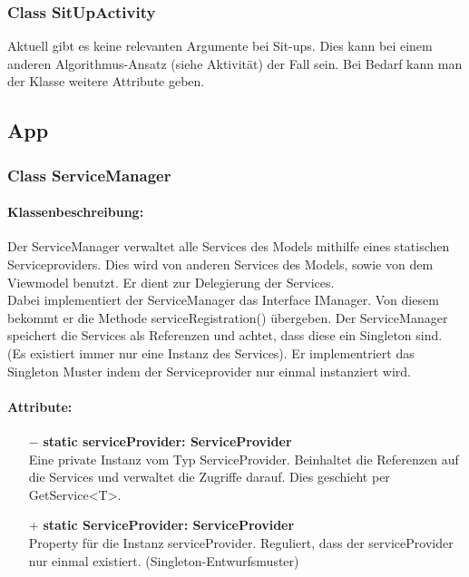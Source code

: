 \documentclass[a4paper,12pt]{article}
\begin{document}
	\subsubsection{Class SitUpActivity}
	Aktuell gibt es keine relevanten Argumente bei Sit-ups. Dies kann bei einem anderen Algorithmus-Ansatz (siehe Aktivität) der Fall sein. Bei Bedarf kann man der Klasse weitere Attribute geben.
	

\subsection{App}
\subsubsection{Class ServiceManager}
	\paragraph{Klassenbeschreibung:}
	Der ServiceManager verwaltet alle Services des Models mithilfe eines statischen Serviceproviders. Dies wird von anderen Services des Models, sowie von dem Viewmodel benutzt. Er dient zur Delegierung der Services.\\ 
	Dabei implementiert der ServiceManager das Interface IManager.
	Von diesem bekommt er die Methode serviceRegistration() übergeben.
	Der ServiceManager speichert die Services als Referenzen und achtet, dass diese ein Singleton sind. (Es existiert immer nur eine Instanz des Services).
	Er implementriert das Singleton Muster indem der Serviceprovider nur einmal instanziert wird.
	
	\paragraph{Attribute:}
	\begin{itemize}
		\item[$-$] \textbf{static serviceProvider: ServiceProvider}\\Eine private Instanz vom Typ ServiceProvider. Beinhaltet die Referenzen auf die Services und verwaltet die Zugriffe darauf. Dies geschieht per GetService<T>.
		\item[+] \textbf{static ServiceProvider: ServiceProvider}\\Property für die Instanz serviceProvider. Reguliert, dass der serviceProvider nur einmal existiert. (Singleton-Entwurfsmuster)

	\end{itemize}
\end{document}
